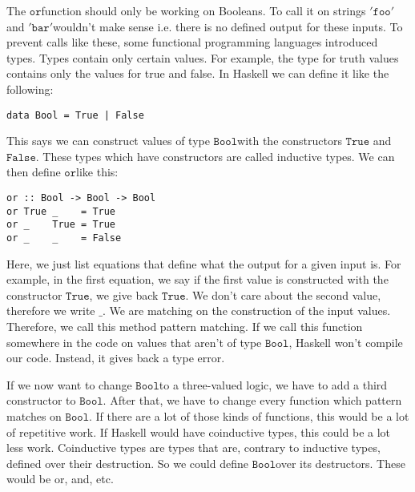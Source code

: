 \documentclass[a4paper,cleardoubleempty,BCOR1cm]{scrbook}
\begin{document}
The $\mathtt{or}$\;function should only be working on Booleans. To call it on strings
$\mathtt{'foo'}$\;and $\mathtt{'bar'}$\;wouldn't make sense i.e. there is no defined output for
these inputs. To prevent calls like these, some functional programming
languages introduced types. Types contain only certain values. For example, the
type for truth values contains only the values for true and false. In Haskell
we can define it like the following:
\begin{verbatim}
data Bool = True | False
\end{verbatim}
This says we can construct values of type $\mathtt{Bool}$\;with the constructors $\mathtt{True}$
and $\mathtt{False}$. These types which have constructors are called inductive types. We can
then define $\mathtt{or}$\;like this:
\begin{verbatim}
or :: Bool -> Bool -> Bool
or True _    = True
or _    True = True
or _    _    = False
\end{verbatim}
Here, we just list equations that define what the output for a given input is.
For example, in the first equation, we say if the first value is constructed
with the constructor $\mathtt{True}$, we give back $\mathtt{True}$.  We don't care about the
second value, therefore we write $\mathtt{\_}$.  We are matching on the construction of
the input values.  Therefore, we call this method pattern matching.
If we call this function somewhere in the code on values that aren't of type
$\mathtt{Bool}$,  Haskell won't compile our code.  Instead, it gives back a type error.

If we now want to change $\mathtt{Bool}$\;to a three-valued logic, we have to add a
third constructor to $\mathtt{Bool}$. After that, we have to change every function which
pattern matches on $\mathtt{Bool}$. If there are a lot of those kinds of functions,
this would be a lot of repetitive work. If Haskell would have coinductive types,
this could be a lot less work. Coinductive types are types that are, 
contrary to inductive types, defined over their destruction. So we could define
$\mathtt{Bool}$\;over its destructors. These would be or, and, etc.
\end{document}
